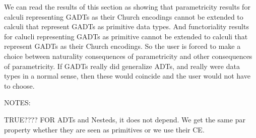 \documentclass[acmsmall,screen,review,anonymous]{acmart}
\theoremstyle{definition}
\begin{document}

We can read the results of this section as showing that parametricity
results for calculi representing GADTs as their Church encodings
cannot be extended to calculi that represent GADTs as primitive data
types. And functoriality results for calucli representing GADTs as
primitive cannot be extended to calculi that represent GADTs as their
Church encodings.  So the user is forced to make a choice between
naturality consequences of parametricity and other consequences of
parametricity. If GADTs really did generalize ADTs, and really were
data types in a normal sense, then these would coincide and the user
would not have to choose.

\vspace*{0.2in}

NOTES:

{\color{violet} TRUE????}
FOR ADTs and Nesteds, it does not depend. We get the same par property
whether they are seen as primitives or we use their CE.


\begin{comment}
{\color{violet} This is already in the paper, split in multiple places.}
An analysis of the Eq A B type in Bob's systems shows that the set
interpretation is empty whenever the A and B have different set
interpretations.  Likewise, its relational interpretation is the empty
relation whenever the A and B have different relational
interpretations (even when the underlying set interpretations are the
same).  The consequences of parametricity are thus immediate: there
can be no term of type Eq A B if A and B are different types.
Moreover, this behavior is fundamentally non-functorial, so that there
is no hope of defining a map for Eq.  In particular, that means we
cannot expect to retrieve non-trivial naturality properties for the Eq
type, despite these are usually considered to be a special case of
parametricity properties.  Indeed, the common understanding that
parametricity generalizes naturality only makes sense for functorial
types.  We can specialize these considerations to the type Eq 1 B,
representing G, our example GADT defined by a unique constructor c ::
G 1.
\end{comment}
\end{document}
